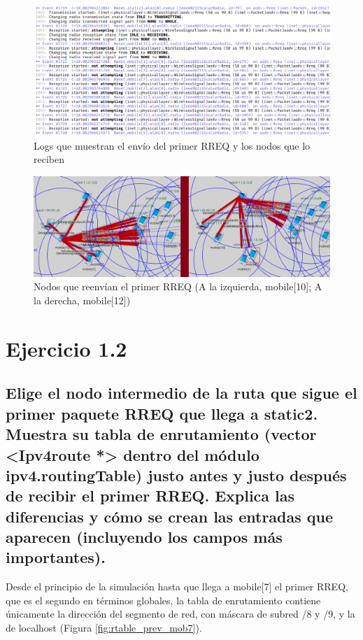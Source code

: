 \begin{figure}[H]
    \centering
    \includegraphics[width=125mm, scale=0.75]{imaxes/ejercicio1_1.png}
    \caption{Logs que muestran el envío del primer RREQ y los nodos que lo reciben}
    \label{fig:primer_rreq_reception}
\end{figure}

\begin{figure}[H]
    \centering
    \includegraphics[width=125mm, scale=0.75]{imaxes/ejercicio1_2.png}
    \caption{Nodos que reenvían el primer RREQ (A la izquierda, mobile[10]; A la derecha, mobile[12])}
    \label{fig:primer_rreq_transmission}
\end{figure}

\vspace{1.25cm}
\section{Ejercicio 1.2}

\subsection{Elige el nodo intermedio de la ruta que sigue el primer paquete RREQ que llega a static2. Muestra su tabla
de enrutamiento (vector <Ipv4route *> dentro del módulo ipv4.routingTable) justo antes y justo después de
recibir el primer RREQ. Explica las diferencias y cómo se crean las entradas que aparecen (incluyendo los campos
más importantes).}

Desde el principio de la simulación hasta que llega a mobile[7] el primer RREQ, que es el segundo en términos globales, la tabla de enrutamiento contiene únicamente la dirección del segmento de red, con máscara de subred /8 y /9, y la de localhost (Figura \ref{fig:rtable_prev_mob7}).

